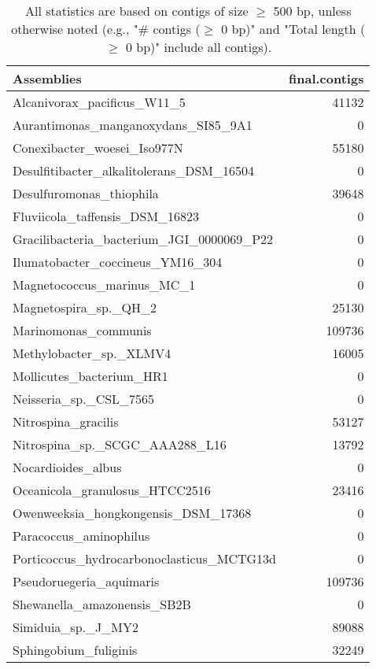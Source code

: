 \documentclass[12pt,a4paper]{article}
\begin{document}
\begin{table}[ht]
\begin{center}
\caption{All statistics are based on contigs of size $\geq$ 500 bp, unless otherwise noted (e.g., "\# contigs ($\geq$ 0 bp)" and "Total length ($\geq$ 0 bp)" include all contigs).}
\begin{tabular}{|l*{1}{|r}|}
\hline
Assemblies & final.contigs \\ \hline
Alcanivorax\_pacificus\_W11\_5 & 41132 \\ \hline
Aurantimonas\_manganoxydans\_SI85\_9A1 & 0 \\ \hline
Conexibacter\_woesei\_Iso977N & 55180 \\ \hline
Desulfitibacter\_alkalitolerans\_DSM\_16504 & 0 \\ \hline
Desulfuromonas\_thiophila & 39648 \\ \hline
Fluviicola\_taffensis\_DSM\_16823 & 0 \\ \hline
Gracilibacteria\_bacterium\_JGI\_0000069\_P22 & 0 \\ \hline
Ilumatobacter\_coccineus\_YM16\_304 & 0 \\ \hline
Magnetococcus\_marinus\_MC\_1 & 0 \\ \hline
Magnetospira\_sp.\_QH\_2 & 25130 \\ \hline
Marinomonas\_communis & 109736 \\ \hline
Methylobacter\_sp.\_XLMV4 & 16005 \\ \hline
Mollicutes\_bacterium\_HR1 & 0 \\ \hline
Neisseria\_sp.\_CSL\_7565 & 0 \\ \hline
Nitrospina\_gracilis & 53127 \\ \hline
Nitrospina\_sp.\_SCGC\_AAA288\_L16 & 13792 \\ \hline
Nocardioides\_albus & 0 \\ \hline
Oceanicola\_granulosus\_HTCC2516 & 23416 \\ \hline
Owenweeksia\_hongkongensis\_DSM\_17368 & 0 \\ \hline
Paracoccus\_aminophilus & 0 \\ \hline
Porticoccus\_hydrocarbonoclasticus\_MCTG13d & 0 \\ \hline
Pseudoruegeria\_aquimaris & 109736 \\ \hline
Shewanella\_amazonensis\_SB2B & 0 \\ \hline
Simiduia\_sp.\_J\_MY2 & 89088 \\ \hline
Sphingobium\_fuliginis & 32249 \\ \hline

\end{tabular}
\end{center}
\end{table}
\end{document}
